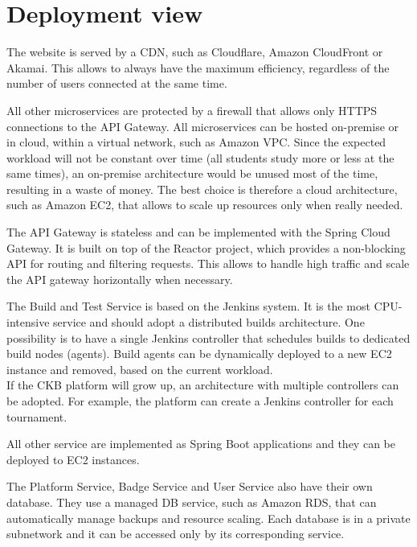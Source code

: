 \section{Deployment view}
\begin{adjustbox}{
        max size={\textwidth}{},
        caption={Deployment view diagram},
        label={fig:Deployment view diagram},
        figure=H}
    \centering
\end{adjustbox}

The website is served by a CDN, such as Cloudflare, Amazon CloudFront or Akamai.
This allows to always have the maximum efficiency, regardless of the number of users connected at the same time.

All other microservices are protected by a firewall that allows only HTTPS connections to the API Gateway.
All microservices can be hosted on-premise or in cloud, within a virtual network, such as Amazon VPC.
Since the expected workload will not be constant over time (all students study more or less at the same times),
an on-premise architecture would be unused most of the time, resulting in a waste of money.
The best choice is therefore a cloud architecture, such as Amazon EC2, that allows to scale up resources only when really needed.

The API Gateway is stateless and can be implemented with the Spring Cloud Gateway. 
It is built on top of the Reactor project, which provides a non-blocking API for routing and filtering requests.
This allows to handle high traffic and scale the API gateway horizontally when necessary.

The Build and Test Service is based on the Jenkins system.
It is the most CPU-intensive service and should adopt a distributed builds architecture.
One possibility is to have a single Jenkins controller that schedules builds to dedicated build nodes (agents).
Build agents can be dynamically deployed to a new EC2 instance and removed, based on the current workload.\\
If the CKB platform will grow up, an architecture with multiple controllers can be adopted.
For example, the platform can create a Jenkins controller for each tournament.

All other service are implemented as Spring Boot applications and they can be deployed to EC2 instances.

The Platform Service, Badge Service and User Service also have their own database.
They use a managed DB service, such as Amazon RDS, that can automatically manage backups and resource scaling.
Each database is in a private subnetwork and it can be accessed only by its corresponding service.

